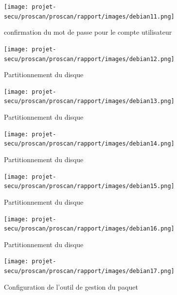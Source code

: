 \documentclass[11pt,a4paper,titlepage, oneside]{article}
\begin{document}
	
	\newpage
                \begin{figure}[h]
                        \centering
                        \texttt{[image: projet-secu/proscan/proscan/rapport/images/debian11.png]}
                        \caption{confirmation du mot de passe pour le compte utilisateur}
                \end{figure}

	 \newpage
                \begin{figure}[h]
                        \centering
                        \texttt{[image: projet-secu/proscan/proscan/rapport/images/debian12.png]}
                        \caption{Partitionnement du disque}
                \end{figure}

	 \newpage
                \begin{figure}[h]
                        \centering
                        \texttt{[image: projet-secu/proscan/proscan/rapport/images/debian13.png]}
                        \caption{Partitionnement du disque}
                \end{figure}


		 \newpage
                \begin{figure}[h]
                        \centering
                        \texttt{[image: projet-secu/proscan/proscan/rapport/images/debian14.png]}
                        \caption{Partitionnement du disque}
                \end{figure}

	\newpage
                \begin{figure}[h]
                        \centering
                        \texttt{[image: projet-secu/proscan/proscan/rapport/images/debian15.png]}
                        \caption{Partitionnement du disque}
                \end{figure}

	\newpage
                \begin{figure}[h]
                        \centering
                        \texttt{[image: projet-secu/proscan/proscan/rapport/images/debian16.png]}
                        \caption{Partitionnement du disque}
                \end{figure}

	\newpage
                \begin{figure}[h]
                        \centering
                        \texttt{[image: projet-secu/proscan/proscan/rapport/images/debian17.png]}
                        \caption{Configuration de l'outil de gestion du paquet}
                \end{figure}
\end{document}

